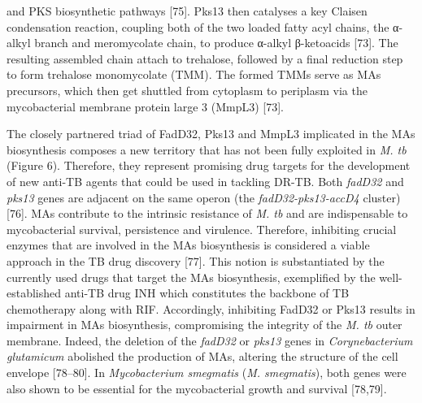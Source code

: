 \documentclass{article}
\begin{document}
and PKS biosynthetic pathways [75]. Pks13 then catalyses a key Claisen condensation reaction, coupling both of the two loaded fatty acyl chains, the α-alkyl branch and meromycolate chain, to produce α-alkyl β-ketoacids [73]. The resulting assembled chain attach to trehalose, followed by a final reduction step to form trehalose monomycolate (TMM). The formed TMMs serve as MAs precursors, which then get shuttled from cytoplasm to periplasm via the mycobacterial membrane protein large 3 (MmpL3) [73].

The closely partnered triad of FadD32, Pks13 and MmpL3 implicated in the MAs biosynthesis composes a new territory that has not been fully exploited in \textit{M. tb} (Figure 6). Therefore, they represent promising drug targets for the development of new anti-TB agents that could be used in tackling DR-TB. Both \textit{fadD32} and \textit{pks13} genes are adjacent on the same operon (the \textit{fadD32-pks13-accD4} cluster) [76]. MAs contribute to the intrinsic resistance of \textit{M. tb} and are indispensable to mycobacterial survival, persistence and virulence. Therefore, inhibiting crucial enzymes that are involved in the MAs biosynthesis is considered a viable approach in the TB drug discovery [77]. This notion is substantiated by the currently used drugs that target the MAs biosynthesis, exemplified by the well-established anti-TB drug INH which constitutes the backbone of TB chemotherapy along with RIF. Accordingly, inhibiting FadD32 or Pks13 results in impairment in MAs biosynthesis, compromising the integrity of the \textit{M. tb} outer membrane. Indeed, the deletion of the \textit{fadD32} or \textit{pks13} genes in \textit{Corynebacterium glutamicum} abolished the production of MAs, altering the structure of the cell envelope [78–80]. In \textit{Mycobacterium smegmatis} (\textit{M. smegmatis}), both genes were also shown to be essential for the mycobacterial growth and survival [78,79].
\end{document}
